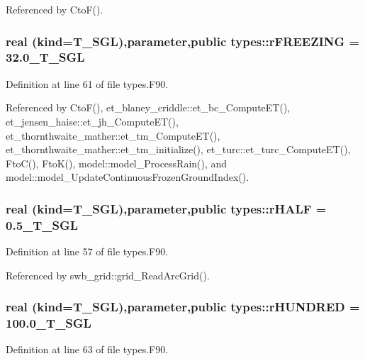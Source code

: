Referenced by CtoF().

\hypertarget{namespacetypes_a80a8178ea4741071027cb936192002ad}{
\subsubsection[{rFREEZING}]{\setlength{\rightskip}{0pt plus 5cm}real (kind={\bf T\_\-SGL}),parameter,public {\bf types::rFREEZING} = 32.0\_\-T\_\-SGL}}
\label{namespacetypes_a80a8178ea4741071027cb936192002ad}


Definition at line 61 of file types.F90.



Referenced by CtoF(), et\_\-blaney\_\-criddle::et\_\-bc\_\-ComputeET(), et\_\-jensen\_\-haise::et\_\-jh\_\-ComputeET(), et\_\-thornthwaite\_\-mather::et\_\-tm\_\-ComputeET(), et\_\-thornthwaite\_\-mather::et\_\-tm\_\-initialize(), et\_\-turc::et\_\-turc\_\-ComputeET(), FtoC(), FtoK(), model::model\_\-ProcessRain(), and model::model\_\-UpdateContinuousFrozenGroundIndex().

\hypertarget{namespacetypes_a496f566e809e4eaac5c2d3b6138667d1}{
\subsubsection[{rHALF}]{\setlength{\rightskip}{0pt plus 5cm}real (kind={\bf T\_\-SGL}),parameter,public {\bf types::rHALF} = 0.5\_\-T\_\-SGL}}
\label{namespacetypes_a496f566e809e4eaac5c2d3b6138667d1}


Definition at line 57 of file types.F90.



Referenced by swb\_\-grid::grid\_\-ReadArcGrid().

\hypertarget{namespacetypes_a97b2b1d206618d3a266b45e582f7ebf3}{
\subsubsection[{rHUNDRED}]{\setlength{\rightskip}{0pt plus 5cm}real (kind={\bf T\_\-SGL}),parameter,public {\bf types::rHUNDRED} = 100.0\_\-T\_\-SGL}}
\label{namespacetypes_a97b2b1d206618d3a266b45e582f7ebf3}


Definition at line 63 of file types.F90.



